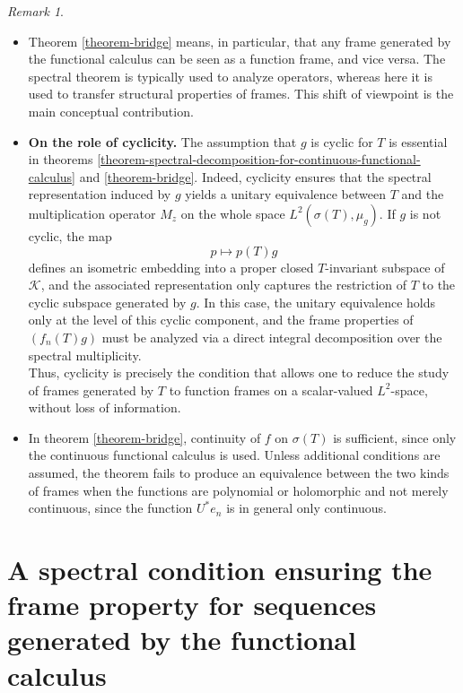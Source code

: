 \documentclass[a4paper,11pt]{article}
\theoremstyle{plain}
\theoremstyle{definition}
\theoremstyle{remark}
\newtheorem{remark}[theorem]{Remark}
\begin{document}
\begin{remark}
\mbox{} \\
\begin{itemize}
\item Theorem \ref{theorem-bridge} means, in particular, that any frame generated by the functional calculus can be seen as a function frame, and vice versa. The spectral theorem is typically used to analyze operators, whereas here it is used to transfer structural properties of frames. This shift of viewpoint is the main conceptual contribution.

\item \textbf{On the role of cyclicity. } The assumption that $g$ is cyclic for $T$ is essential in theorems \ref{theorem-spectral-decomposition-for-continuous-functional-calculus} and \ref{theorem-bridge}.
Indeed, cyclicity ensures that the spectral representation induced by $g$
yields a unitary equivalence between $T$ and the multiplication operator $M_z$
on the whole space $L^2(\sigma(T),\mu_g)$. If $g$ is not cyclic, the map
\[
p \mapsto p(T)g
\]
defines an isometric embedding into a proper closed $T$-invariant subspace of
$\mathcal{K}$, and the associated representation only captures the restriction
of $T$ to the cyclic subspace generated by $g$.
In this case, the unitary equivalence holds only at the level of this cyclic
component, and the frame properties of $(f_n(T)g)$ must be analyzed via a
direct integral decomposition over the spectral multiplicity. \\
Thus, cyclicity is precisely the condition that allows one to reduce the study
of frames generated by $T$ to function frames on a scalar-valued $L^2$-space,
without loss of information.
\item In theorem \ref{theorem-bridge}, continuity of $f$ on $\sigma(T)$ is sufficient, since only the
continuous functional calculus is used. Unless additional conditions are assumed, the theorem fails to produce an equivalence between the two kinds of frames when the functions are polynomial or holomorphic and not merely continuous, since the function $U^* e_n$ is in general only continuous.
\end{itemize}
\end{remark}

\section{A spectral condition ensuring the frame property for sequences generated by the functional calculus}
\label{MainSection}
\end{document}
